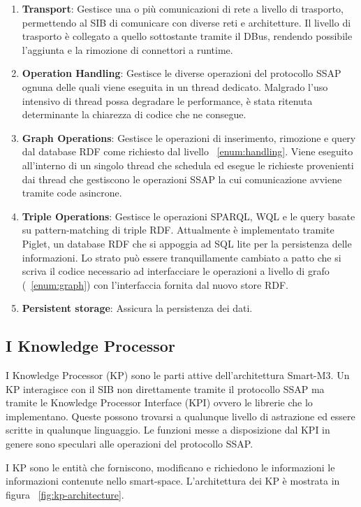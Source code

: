 \begin{enumerate}
	\item \textbf{Transport}: Gestisce una o più comunicazioni di rete a livello di trasporto, permettendo al SIB di comunicare con diverse reti e architetture. Il livello di trasporto è collegato a quello sottostante tramite il DBus, rendendo possibile l'aggiunta e la rimozione di connettori a runtime.
	\item \label{enum:handling}\textbf{Operation Handling}: Gestisce le diverse operazioni del protocollo SSAP ognuna delle quali viene eseguita in un thread dedicato. Malgrado l'uso intensivo di thread possa degradare le performance,  è stata ritenuta determinante la chiarezza di codice che ne consegue.
	\item \label{enum:graph}\textbf{Graph Operations}: Gestisce le operazioni di inserimento, rimozione e query dal database RDF come richiesto dal livello ~\ref{enum:handling}. Viene eseguito all'interno di un singolo thread che schedula ed esegue le richieste provenienti dai thread che gestiscono le operazioni SSAP la cui comunicazione avviene tramite code asincrone.
	\item \textbf{Triple Operations}: Gestisce le operazioni SPARQL, WQL e le query basate su pattern-matching di triple RDF. Attualmente è implementato tramite Piglet, un database RDF che si appoggia ad SQL lite per la persistenza delle informazioni. Lo strato può essere tranquillamente cambiato a patto che si scriva il codice necessario ad interfacciare le operazioni a livello di grafo (~\ref{enum:graph}) con l'interfaccia fornita dal nuovo store RDF.
	\item \textbf{Persistent storage}: Assicura la persistenza dei dati.
\end{enumerate}

\subsection{I Knowledge Processor}

I Knowledge Processor (KP) sono le parti attive dell'architettura Smart-M3. Un KP interagisce con il SIB non direttamente tramite il protocollo SSAP ma tramite le Knowledge Processor Interface (KPI) ovvero le librerie che lo implementano. Queste possono trovarsi a qualunque livello di astrazione ed essere scritte in qualunque linguaggio. Le funzioni messe a disposizione dal KPI in genere sono speculari alle operazioni del protocollo SSAP.

I KP sono le entità che forniscono, modificano e richiedono le informazioni le informazioni contenute nello smart-space. L'architettura dei KP è mostrata in figura ~\ref{fig:kp-architecture}.

